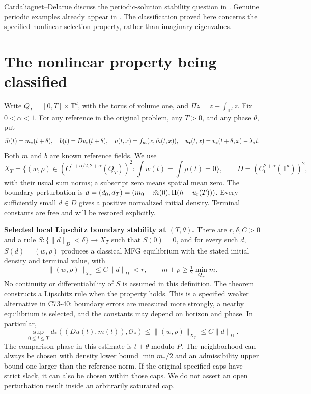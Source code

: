 \documentclass[11pt,a4paper]{article}
\begin{document}
Cardaliaguet--Delarue discuss the periodic-solution stability question
in \cite[Section 3.3, paragraph ``Periodic solutions,'' p.~3681]{CD}.
Genuine periodic examples already appear in
\cite[Section 6, Theorem 6.1 and Remark 6.4]{CN}. The classification proved
here concerns the specified nonlinear selection property, rather than imaginary eigenvalues.

\section{The nonlinear property being classified}
Write $Q_T=[0,T]\times\mathbb T^d$, with the torus of volume one, and
$\Pi z=z-\int_{\mathbb T^d}z$. Fix $0<\alpha<1$.
For any reference in the original problem, any $T>0$, and any phase
$\theta$, put
\[
 \bar m(t)=m_*(t+\theta),\quad b(t)=Dv_*(t+\theta),\quad
 a(t,x)=f_m(x,\bar m(t,x)),\quad
 u_{\rm r}(t,x)=v_*(t+\theta,x)-\lambda_*t.
\]
Both $\bar m$ and $b$ are known reference fields. We use
\[
 X_T=\{(w,\rho)\in(C^{1+\alpha/2,2+\alpha}(Q_T))^2:
                  \textstyle\int w(t)=\int\rho(t)=0\},\qquad
 D=(C^{2+\alpha}_0(\mathbb T^d))^2,
\]
with their usual sum norms; a subscript zero means spatial mean zero.
The boundary perturbation is
$d=(d_0,d_T)=(m_0-\bar m(0),\Pi(h-u_{\rm r}(T)))$.
Every sufficiently small $d\in D$ gives a positive normalized initial
density. Terminal constants are free and will be restored explicitly.

\textbf{Selected local Lipschitz boundary stability at $(T,\theta)$.}
There are $r,\delta,C>0$ and a rule $S:\{\|d\|_D<\delta\}\to X_T$
such that $S(0)=0$, and for every such $d$, $S(d)=(w,\rho)$ produces
a classical MFG equilibrium with the stated initial density and terminal
value, with
\begin{equation}\tag{W1}\label{W1}
 \|(w,\rho)\|_{X_T}\leq C\|d\|_D<r,
 \qquad \bar m+\rho\geq\tfrac12\min_{Q_T}\bar m.
\end{equation}
No continuity or differentiability of $S$ is assumed in this definition.
The theorem constructs a Lipschitz rule when the property
holds. This is a specified weaker alternative in C73-40: boundary errors
are measured more strongly, a nearby equilibrium is selected, and the
constants may depend on horizon and phase. In particular,
\begin{equation}\tag{W2}\label{W2}
 \sup_{0\leq t\leq T}d_*((Du(t),m(t)),\mathcal O_*)
 \leq\|(w,\rho)\|_{X_T}\leq C\|d\|_D.
\end{equation}
The comparison phase in this estimate is $t+\theta$ modulo $P$.
The neighborhood can always be chosen with density lower bound
$\min m_*/2$ and an admissibility upper bound one larger than the
reference norm. If the original specified caps have strict slack, it
can also be chosen within those caps. We do not assert an open
perturbation result inside an arbitrarily saturated cap.
\end{document}
